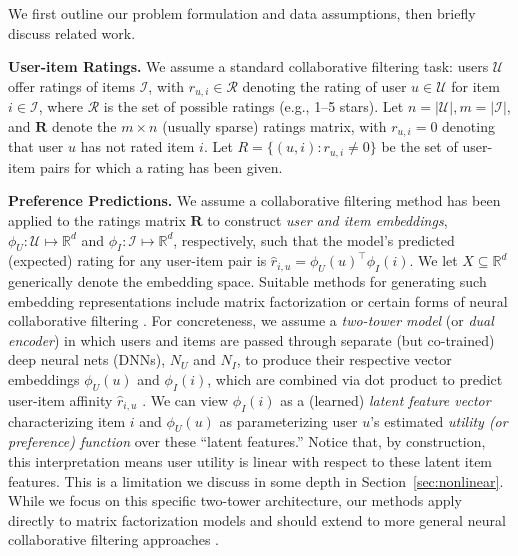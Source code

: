 \documentclass[manuscript,screen,nonacm]{acmart}
\newcommand{\R}{\mathbb{R}}
\newcommand{\1}{{\mathbf 1}}
\newcommand{\bfR}{\mathbf{R}}
\newcommand{\calU}{\mathcal{U}}
\newcommand{\calR}{\mathcal{R}}
\newcommand{\calI}{\mathcal{I}}
\newcommand{\hatr}{\hat{r}}
\theoremstyle{TheoremNum}
\begin{document}
We first outline our problem formulation and data assumptions, then briefly discuss related work.


\vskip 2mm
\noindent
\textbf{User-item Ratings.} \hspace*{2mm}
We assume a standard collaborative filtering task: users $\calU$ offer ratings of items $\calI$, with $r_{u,i}\in\calR$ denoting
the rating of user $u\in\calU$ for item $i\in\calI$, where $\calR$ is the set of possible ratings
(e.g., 1--5 stars). Let $n=|\calU|, m=|\calI|$, and $\bfR$ denote the $m\times n$ (usually sparse) ratings matrix,
with $r_{u,i}\!=\! 0$ denoting that user $u$ has not rated item $i$. Let $R = \{(u,i) : r_{u,i} \neq 0\}$ be the set of user-item pairs for which a rating has been given.


\vskip 2mm
\noindent
\textbf{Preference Predictions.} \hspace*{2mm}
We assume a collaborative filtering method has been applied to the ratings matrix $\bfR$ to construct \emph{user and item embeddings}, $\phi_U:\calU \mapsto \R^d$ and $\phi_I: \calI \mapsto \R^d$, respectively, such that the model's predicted (expected) rating for any user-item pair is $\hatr_{i,u} = \phi_U(u)^\top \phi_I(i)$. We let $X\subseteq \R^d$ generically denote the embedding space. Suitable methods for generating such embedding representations include
matrix factorization \cite{salakhutdinov-mnih:nips07} or certain forms of neural collaborative filtering
\cite{beutel_etal:wsdm18,yangEtAl:www20}. For concreteness,
we assume a \emph{two-tower model} (or \emph{dual encoder}) in which users and items are passed through separate (but co-trained) deep neural nets (DNNs), $N_U$ and $N_I$, to produce their respective vector embeddings $\phi_U(u)$ and $\phi_I(i)$, which are combined via dot product to predict user-item affinity $\hatr_{i,u}$ \cite{yiEtAl:recsys19,yangEtAl:www20}. 
We can view $\phi_I(i)$ as a (learned) \emph{latent feature vector} characterizing item $i$ and $\phi_U(u)$ as parameterizing user $u$'s estimated \emph{utility (or preference) function} over these ``latent features.'' Notice that, by construction, this interpretation means user utility is linear with respect to these latent item features. This is a limitation we discuss in some depth in Section~\ref{sec:nonlinear}.
While we focus on this specific two-tower architecture, our methods apply directly to matrix factorization models and should extend to more general 
neural collaborative filtering approaches \cite{he_etal:www17}.
\end{document}
